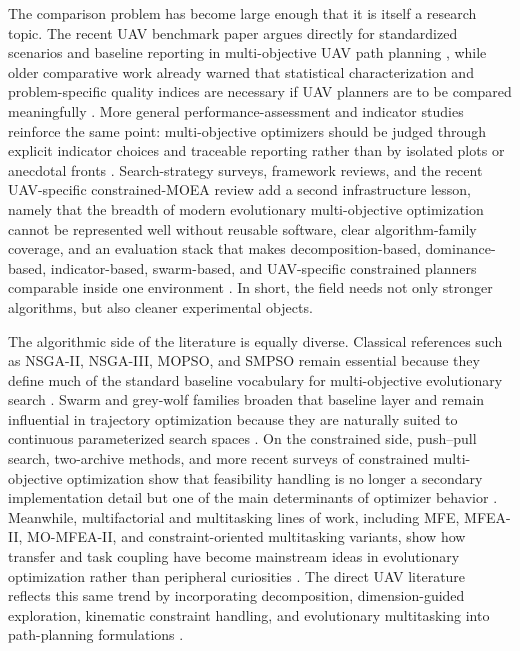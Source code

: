 \documentclass[a4paper,fleqn]{cas-dc}
\begin{document}
The comparison problem has become large enough that it is itself a research topic. The recent UAV benchmark paper argues directly for standardized scenarios and baseline reporting in multi-objective UAV path planning \cite{ref10}, while older comparative work already warned that statistical characterization and problem-specific quality indices are necessary if UAV planners are to be compared meaningfully \cite{ref22}. More general performance-assessment and indicator studies reinforce the same point: multi-objective optimizers should be judged through explicit indicator choices and traceable reporting rather than by isolated plots or anecdotal fronts \cite{ref49,ref50}. Search-strategy surveys, framework reviews, and the recent UAV-specific constrained-MOEA review add a second infrastructure lesson, namely that the breadth of modern evolutionary multi-objective optimization cannot be represented well without reusable software, clear algorithm-family coverage, and an evaluation stack that makes decomposition-based, dominance-based, indicator-based, swarm-based, and UAV-specific constrained planners comparable inside one environment \cite{ref32,ref33,ref6,ref34,ref35}. In short, the field needs not only stronger algorithms, but also cleaner experimental objects.

The algorithmic side of the literature is equally diverse. Classical references such as NSGA-II, NSGA-III, MOPSO, and SMPSO remain essential because they define much of the standard baseline vocabulary for multi-objective evolutionary search \cite{ref36,ref37,ref38,ref39}. Swarm and grey-wolf families broaden that baseline layer and remain influential in trajectory optimization because they are naturally suited to continuous parameterized search spaces \cite{ref40,ref41}. On the constrained side, push--pull search, two-archive methods, and more recent surveys of constrained multi-objective optimization show that feasibility handling is no longer a secondary implementation detail but one of the main determinants of optimizer behavior \cite{ref42,ref43,ref34,ref35,ref48}. Meanwhile, multifactorial and multitasking lines of work, including MFE, MFEA-II, MO-MFEA-II, and constraint-oriented multitasking variants, show how transfer and task coupling have become mainstream ideas in evolutionary optimization rather than peripheral curiosities \cite{ref44,ref45,ref46,ref47}. The direct UAV literature reflects this same trend by incorporating decomposition, dimension-guided exploration, kinematic constraint handling, and evolutionary multitasking into path-planning formulations \cite{ref15,ref16,ref17,ref18,ref19}.
\end{document}
